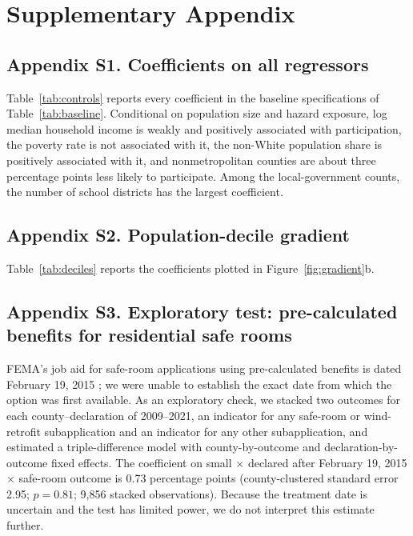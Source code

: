 \setcounter{table}{0}
\setcounter{figure}{0}
\renewcommand{\thetable}{S\arabic{table}}
\renewcommand{\thefigure}{S\arabic{figure}}
\section*{Supplementary Appendix}

\subsection*{Appendix S1. Coefficients on all regressors}

Table~\ref{tab:controls} reports every coefficient in the baseline specifications of Table~\ref{tab:baseline}. Conditional on population size and hazard exposure, log median household income is weakly and positively associated with participation, the poverty rate is not associated with it, the non-White population share is positively associated with it, and nonmetropolitan counties are about three percentage points less likely to participate. Among the local-government counts, the number of school districts has the largest coefficient.



\subsection*{Appendix S2. Population-decile gradient}

Table~\ref{tab:deciles} reports the coefficients plotted in Figure~\ref{fig:gradient}b.



\subsection*{Appendix S3. Exploratory test: pre-calculated benefits for residential safe rooms}

FEMA's job aid for safe-room applications using pre-calculated benefits is dated February 19, 2015 \parencite{fema2015saferoomprecalc}; we were unable to establish the exact date from which the option was first available. As an exploratory check, we stacked two outcomes for each county--declaration of 2009--2021, an indicator for any safe-room or wind-retrofit subapplication and an indicator for any other subapplication, and estimated a triple-difference model with county-by-outcome and declaration-by-outcome fixed effects. The coefficient on small $\times$ declared after February 19, 2015 $\times$ safe-room outcome is 0.73 percentage points (county-clustered standard error 2.95; $p = 0.81$; 9,856 stacked observations). Because the treatment date is uncertain and the test has limited power, we do not interpret this estimate further.

